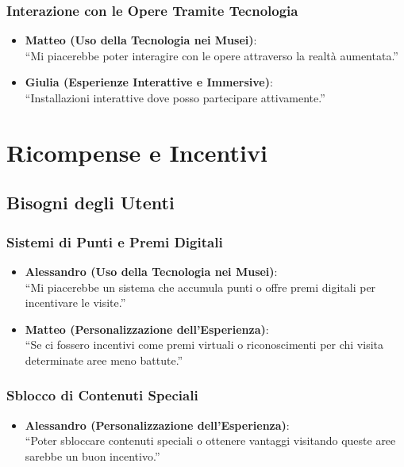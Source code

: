 \documentclass{article}
\begin{document}
\subsubsection{Interazione con le Opere Tramite Tecnologia}

\begin{itemize}
    \item \textbf{Matteo (Uso della Tecnologia nei Musei)}:\\
    ``Mi piacerebbe poter interagire con le opere attraverso la realtà aumentata.''
    \item \textbf{Giulia (Esperienze Interattive e Immersive)}:\\
    ``Installazioni interattive dove posso partecipare attivamente.''
\end{itemize}

\section{Ricompense e Incentivi}

\subsection{Bisogni degli Utenti}

\subsubsection{Sistemi di Punti e Premi Digitali}

\begin{itemize}
    \item \textbf{Alessandro (Uso della Tecnologia nei Musei)}:\\
    ``Mi piacerebbe un sistema che accumula punti o offre premi digitali per incentivare le visite.''
    \item \textbf{Matteo (Personalizzazione dell'Esperienza)}:\\
    ``Se ci fossero incentivi come premi virtuali o riconoscimenti per chi visita determinate aree meno battute.''
\end{itemize}

\subsubsection{Sblocco di Contenuti Speciali}

\begin{itemize}
    \item \textbf{Alessandro (Personalizzazione dell'Esperienza)}:\\
    ``Poter sbloccare contenuti speciali o ottenere vantaggi visitando queste aree sarebbe un buon incentivo.''
\end{itemize}
\end{document}
